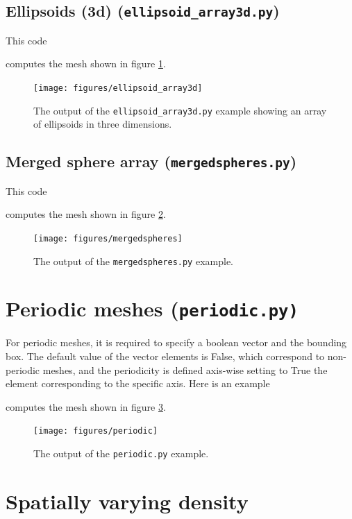 \documentclass[10pt,a4paper]{book}
\newcommand{\py}[1]{\texttt{\color{blue}#1}}
\begin{document}
\subsection{Ellipsoids (3d) (\texttt{ellipsoid\_array3d.py})}

This code 

computes the mesh shown in figure \ref{fig:ellipsoidarray3d}.
\begin{figure}[tbhp]
\centerline{\texttt{[image: figures/ellipsoid\_array3d]}}
\caption{\label{fig:ellipsoidarray3d} The output of the \py{ellipsoid\_array3d.py} example showing an array of ellipsoids in three dimensions.}
\end{figure}


\subsection{Merged sphere array (\texttt{mergedspheres.py})}

This code 

computes the mesh shown in figure \ref{fig:mergedspheres}.
\begin{figure}[tbhp]
\centerline{\texttt{[image: figures/mergedspheres]}}
\caption{\label{fig:mergedspheres} The output of the \py{mergedspheres.py} example.}
\end{figure}



\section{Periodic meshes (\texttt{periodic.py)}}
\label{sec:periodicmeshes}

For periodic meshes, it is required to specify a boolean vector and
the bounding box. The default value of the vector elements is False, which
correspond to non-periodic meshes, and the periodicity is defined
axis-wise setting to True the element corresponding to the specific axis. 
Here is an example 

computes the mesh shown in figure \ref{fig:periodic}.
\begin{figure}[tbhp]
\centerline{\texttt{[image: figures/periodic]}}
\caption{\label{fig:periodic} The output of the \py{periodic.py} example.}
\end{figure}



\section{Spatially varying density}
\end{document}
